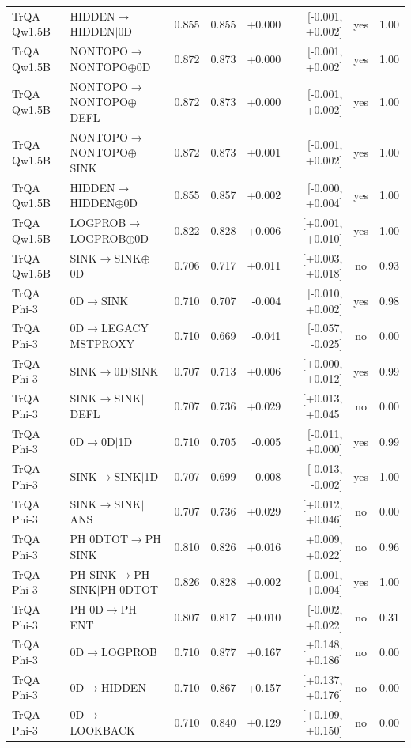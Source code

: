 \begin{longtable}{llrrrrcc}
TrQA Qw1.5B & HIDDEN$\to$HIDDEN$\mid$0D & 0.855 & 0.855 & +0.000 & [-0.001, +0.002] & yes & 1.00 \\
TrQA Qw1.5B & NONTOPO$\to$NONTOPO$\oplus$0D & 0.872 & 0.873 & +0.000 & [-0.001, +0.002] & yes & 1.00 \\
TrQA Qw1.5B & NONTOPO$\to$NONTOPO$\oplus$DEFL & 0.872 & 0.873 & +0.000 & [-0.001, +0.002] & yes & 1.00 \\
TrQA Qw1.5B & NONTOPO$\to$NONTOPO$\oplus$SINK & 0.872 & 0.873 & +0.001 & [-0.001, +0.002] & yes & 1.00 \\
TrQA Qw1.5B & HIDDEN$\to$HIDDEN$\oplus$0D & 0.855 & 0.857 & +0.002 & [-0.000, +0.004] & yes & 1.00 \\
TrQA Qw1.5B & LOGPROB$\to$LOGPROB$\oplus$0D & 0.822 & 0.828 & +0.006 & [+0.001, +0.010] & yes & 1.00 \\
TrQA Qw1.5B & SINK$\to$SINK$\oplus$0D & 0.706 & 0.717 & +0.011 & [+0.003, +0.018] & no & 0.93 \\
TrQA Phi-3 & 0D$\to$SINK & 0.710 & 0.707 & -0.004 & [-0.010, +0.002] & yes & 0.98 \\
TrQA Phi-3 & 0D$\to$LEGACY MSTPROXY & 0.710 & 0.669 & -0.041 & [-0.057, -0.025] & no & 0.00 \\
TrQA Phi-3 & SINK$\to$0D$\mid$SINK & 0.707 & 0.713 & +0.006 & [+0.000, +0.012] & yes & 0.99 \\
TrQA Phi-3 & SINK$\to$SINK$\mid$DEFL & 0.707 & 0.736 & +0.029 & [+0.013, +0.045] & no & 0.00 \\
TrQA Phi-3 & 0D$\to$0D$\mid$1D & 0.710 & 0.705 & -0.005 & [-0.011, +0.000] & yes & 0.99 \\
TrQA Phi-3 & SINK$\to$SINK$\mid$1D & 0.707 & 0.699 & -0.008 & [-0.013, -0.002] & yes & 1.00 \\
TrQA Phi-3 & SINK$\to$SINK$\mid$ANS & 0.707 & 0.736 & +0.029 & [+0.012, +0.046] & no & 0.00 \\
TrQA Phi-3 & PH 0DTOT$\to$PH SINK & 0.810 & 0.826 & +0.016 & [+0.009, +0.022] & no & 0.96 \\
TrQA Phi-3 & PH SINK$\to$PH SINK$\mid$PH 0DTOT & 0.826 & 0.828 & +0.002 & [-0.001, +0.004] & yes & 1.00 \\
TrQA Phi-3 & PH 0D$\to$PH ENT & 0.807 & 0.817 & +0.010 & [-0.002, +0.022] & no & 0.31 \\
TrQA Phi-3 & 0D$\to$LOGPROB & 0.710 & 0.877 & +0.167 & [+0.148, +0.186] & no & 0.00 \\
TrQA Phi-3 & 0D$\to$HIDDEN & 0.710 & 0.867 & +0.157 & [+0.137, +0.176] & no & 0.00 \\
TrQA Phi-3 & 0D$\to$LOOKBACK & 0.710 & 0.840 & +0.129 & [+0.109, +0.150] & no & 0.00 \\

\end{longtable}
